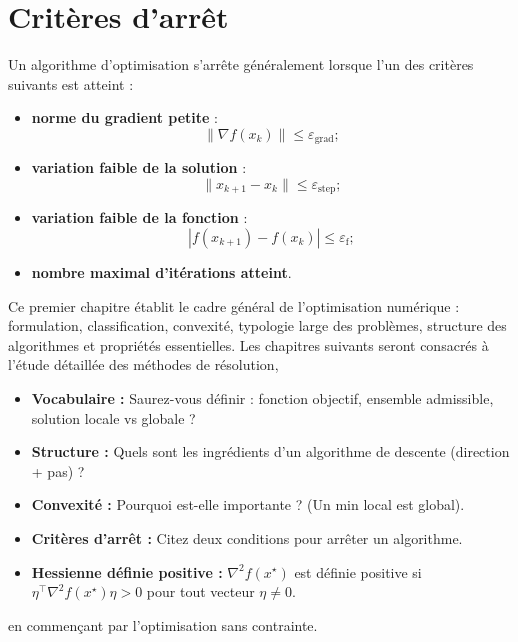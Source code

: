 \section{Critères d'arrêt}

Un algorithme d'optimisation s'arrête généralement lorsque l’un des critères suivants est atteint :

\begin{itemize}
  \item \textbf{norme du gradient petite} :
        \[
        \|\nabla f(x_k)\| \le \varepsilon_{\mathrm{grad}};
        \]
  \item \textbf{variation faible de la solution} :
        \[
        \|x_{k+1}-x_k\|\le \varepsilon_{\mathrm{step}};
        \]
  \item \textbf{variation faible de la fonction} :
        \[
        |f(x_{k+1})-f(x_k)|\le \varepsilon_{\mathrm{f}};
        \]
  \item \textbf{nombre maximal d’itérations atteint}.
\end{itemize}

\medskip

Ce premier chapitre établit le cadre général de l’optimisation numérique : formulation, classification,
convexité, typologie large des problèmes, structure des algorithmes et propriétés essentielles.
Les chapitres suivants seront consacrés à l’étude détaillée des méthodes de résolution,
\bigskip
\begin{checkpoint}
\begin{itemize}
    \item \textbf{Vocabulaire :} Saurez-vous définir : fonction objectif, ensemble admissible, solution locale vs globale ?
    \item \textbf{Structure :} Quels sont les ingrédients d'un algorithme de descente (direction + pas) ?
    \item \textbf{Convexité :} Pourquoi est-elle importante ? (Un min local est global).
    \item \textbf{Critères d'arrêt :} Citez deux conditions pour arrêter un algorithme.
    \item \textbf{Hessienne définie positive :} $\nabla^2 f(x^\star)$ est définie positive si $\eta^\top \nabla^2 f(x^\star) \eta > 0$ pour tout vecteur $\eta \neq 0$.
\end{itemize}
\end{checkpoint}
en commençant par l’optimisation sans contrainte.
